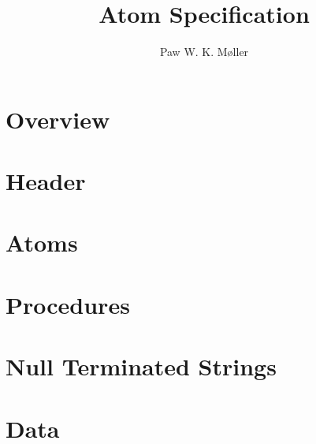 \documentclass[10pt, a4paper]{article}
\title{Atom Specification}
\author{Paw W. K. Møller}
\begin{document}
    \maketitle
    \clearpage
    
    \tableofcontents
    \clearpage
    
    \setcounter{page}{1}
    \setlength{\parskip}{10pt}

    \maketitle
    
    \section{Overview}
    
    
    \section{Header}
    
    
    \section{Atoms}
    
    
    \section{Procedures}
    
    
    \section{Null Terminated Strings}
    
    
    \section{Data}
    
\end{document}
